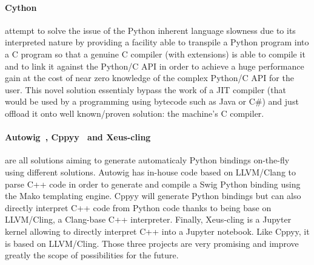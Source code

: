 \paragraph{Cython~\parencite{behnel.2010.cython}} attempt to solve the issue of the Python inherent language slowness
due to its interpreted nature by providing a facility able to transpile a Python program into a C program so that a
genuine C compiler (with extensions) is able to compile it and to link it against the Python/C API in order to achieve a
huge performance gain at the cost of near zero knowledge of the complex Python/C API for the user. This novel solution
essentialy bypass the work of a JIT compiler (that would be used by a programming using bytecode such as Java or C\#)
and just offload it onto well known/proven solution: the machine's C compiler.

\paragraph{Autowig~\parencite{fernique.2018.autowig}, Cppyy~\parencite{wimtlplavrijsen.2016.cppyy} and
  Xeus-cling~\parencite{quantstack.2021.xeus-cling}} are all solutions aiming to generate automaticaly Python bindings
on-the-fly using different solutions. Autowig has in-house code based on LLVM/Clang to parse C++ code in order to
generate and compile a Swig Python binding using the Mako templating engine. Cppyy will generate Python bindings but can
also directly interpret C++ code from Python code thanks to being base on LLVM/Cling, a Clang-base C++ interpreter.
Finally, Xeus-cling is a Jupyter~\parencite{kluyver.2016.jupyter} kernel allowing to directly interpret C++ into a
Jupyter notebook. Like Cppyy, it is based on LLVM/Cling. Those three projects are very promising and improve greatly the
scope of possibilities for the future.
